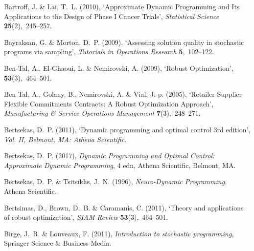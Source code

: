 \documentclass[11pt,oneside,fleqn,reqno,titlepage]{article}
\newcommand{\singlespace}{\addtolength{\baselineskip}{-.5\baselineskip}}
\begin{document}
%
%
\begin{thebibliography}{xx}

Bartroff, J. \& Lai, T.~L.  (2010), `{Approximate Dynamic Programming and Its
  Applications to the Design of Phase I Cancer Trials}', {\em Statistical
  Science} {\bf 25}(2),~245--257.

Bayraksan, G. \& Morton, D.~P.  (2009), `Assessing solution quality in
  stochastic programs via sampling', {\em Tutorials in Operations Research}
  {\bf 5},~102--122.

Ben-Tal, A., El-Ghaoui, L. \& Nemirovski, A.  (2009), `{Robust Optimization}',
  {\bf 53}(3),~464--501.

Ben-Tal, A., Golany, B., Nemirovski, A. \& Vial, J.-p.  (2005),
  `{Retailer-Supplier Flexible Commitments Contracts: A Robust Optimization
  Approach}', {\em Manufacturing \& Service Operations Management} {\bf
  7}(3),~248--271.

Bertsekas, D.~P.  (2011), `Dynamic programming and optimal control 3rd
  edition', {\em Vol. II, Belmont, MA: Athena Scientific}.

Bertsekas, D.~P.  (2017), {\em {Dynamic Programming and Optimal Control:
  Approximate Dynamic Programming}}, 4 edn, Athena Scientific, Belmont, MA.

Bertsekas, D.~P. \& Tsitsiklis, J.~N.  (1996), {\em Neuro-Dynamic Programming},
  Athena Scientific.

Bertsimas, D., Brown, D.~B. \& Caramanis, C.  (2011), `{Theory and applications
  of robust optimization}', {\em SIAM Review} {\bf 53}(3),~464--501.

Birge, J.~R. \& Louveaux, F.  (2011), {\em Introduction to stochastic
  programming}, Springer Science \& Business Media.


\end{thebibliography}
\end{document}

